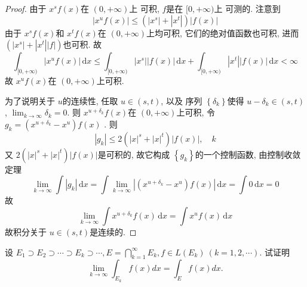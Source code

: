 \documentclass[../main.tex]{subfiles}
\begin{document}
\begin{proof}

    由于 \(  x^{s}f\left( x \right)   \)在 \(  \left( 0,+ \infty \right)   \)上 可积, \(  f  \)是在 \(  [0,+ \infty)  \)上 可测的.  
    注意到  \[
    \left| x^{u}f\left( x \right)  \right|\le \left( \left| x^{s} \right|+ \left| x^{t} \right|   \right)\left| f\left( x \right)  \right|   
    \]由于 \(  x^{s}f\left( x \right)   \)和 \(  x^{t}f\left( x \right)   \)在 \(  \left( 0,+ \infty \right)   \)上均可积, 它们的绝对值函数也可积, 进而 \(  \left( \left| x ^{s}\right|+ \left| x^{t} \right|\left| f \right|    \right)   \)也可积. 故 \[
    \int_{[0,+ \infty)}\left| x^{u}f\left( x \right) \right| \,\mathrm{d} x \le \int_{[0,+ \infty)}\left| x^{s} \right|\left| f\left( x \right)  \right|\,\mathrm{d} x+ \int_{[0,+ \infty)} \left| x^{t} \right|\left| f\left( x \right)  \right|\,\mathrm{d} x< \infty    
    \]故 \(  x^{u}f\left( x \right)   \)在 \(  \left( 0,+ \infty \right)   \)上可积. 
    
    为了说明关于 \(  u  \)的连续性, 任取 \(  u\in \left( s,t \right)   \), 以及 序列 \(  \left\{  \delta _{k} \right\}  \)使得 \(  u- \delta _{k}\in \left( s,t \right)   \), \(  \lim_{k\to \infty} \delta _{k}= 0  \).     则 \(  x^{u+  \delta _{k}}f\left( x \right)   \)在 \(  \left( 0,+ \infty \right)   \)上可积, 令 \(  g_{k}= \left( x^{u+  \delta _{k}} -x^{u}\right)f\left( x \right)    \) . 则 \[
    \left| g_{k} \right|\le 2\left( \left| x \right|^{s}+ \left| x \right|^{t}   \right)\left| f\left( x \right)  \right|   ,\quad k
    \]又 \(  2\left( \left| x \right|^{s}+ \left| x \right|^{t}   \right)\left| f\left( x \right)  \right|    \)是可积的, 故它构成 \(  \left\{ g_{k} \right\}  \)的一个控制函数, 由控制收敛定理 \[
    \lim_{k\to \infty}\int \left| g_{k} \right|\,\mathrm{d} x= \int \lim_{k\to \infty}\left| \left( x^{u+  \delta _{k}} -x^{u}\right)f\left( x \right) \right|    \,\mathrm{d} x= \int 0 \,\mathrm{d} x= 0
    \]  故 \[
    \lim_{k\to \infty}\int x^{u+  \delta _{k}}f\left( x \right)\,\mathrm{d} x= \int x^{u}f\left( x \right)\,\mathrm{d} x  
    \]故积分关于 \(  u\in \left( s,t \right)   \)是连续的. 
\end{proof}
\begin{exercise}{}{}
设 $E_1 \supset E_2 \supset \cdots \supset E_k \supset \cdots, E = \bigcap_{k=1}^{\infty} E_k, f \in L(E_k) \ (k=1, 2, \cdots)$. 试证明
\[
\lim_{k \to \infty} \int_{E_k} f(x) dx = \int_{E} f(x) dx.
\]
\end{exercise}
\end{document}
